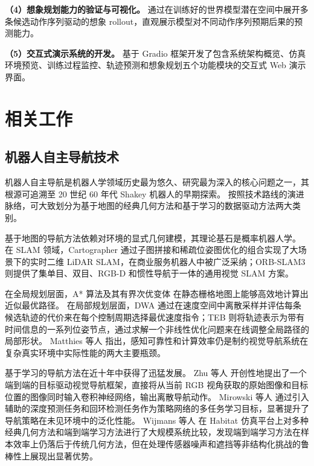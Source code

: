\documentclass[12pt,a4paper]{ctexart}
\begin{document}
\textbf{（4）想象规划能力的验证与可视化。}
通过在训练好的世界模型潜在空间中展开多条候选动作序列驱动的想象 rollout，直观展示模型对不同动作序列预期后果的预测能力。

\textbf{（5）交互式演示系统的开发。}
基于 Gradio 框架开发了包含系统架构概览、仿真环境预览、训练过程监控、轨迹预测和想象规划五个功能模块的交互式 Web 演示界面。

\section{相关工作}

\subsection{机器人自主导航技术}

机器人自主导航是机器人学领域历史最为悠久、研究最为深入的核心问题之一，其根源可追溯至 20 世纪 60 年代 Shakey 机器人的早期探索。
按照技术路线的演进脉络，可大致划分为基于地图的经典几何方法和基于学习的数据驱动方法两大类别。

基于地图的导航方法依赖对环境的显式几何建模，其理论基石是概率机器人学\cite{thrun2005probabilistic}。
在 SLAM 领域，Cartographer\cite{hess2016real} 通过子图拼接和稀疏位姿图优化的组合实现了大场景下的实时二维 LiDAR SLAM，在商业服务机器人中被广泛采纳；ORB-SLAM3\cite{campos2021orb} 则提供了集单目、双目、RGB-D 和惯性导航于一体的通用视觉 SLAM 方案。

在全局规划层面，A* 算法及其有界次优变体\cite{likhachev2005ara} 在静态栅格地图上能够高效地计算出近似最优路径。
在局部规划层面，DWA\cite{fox1997dynamic} 通过在速度空间中离散采样并评估每条候选轨迹的代价来在每个控制周期选择最优速度指令；TEB\cite{rosmann2012trajectory} 则将轨迹表示为带有时间信息的一系列位姿节点，通过求解一个非线性优化问题来在线调整全局路径的局部形状。
Matthies 等人\cite{matthies2007computer} 指出，感知可靠性和计算效率仍是制约视觉导航系统在复杂真实环境中实际性能的两大主要瓶颈。

基于学习的导航方法在近十年中获得了迅猛发展。
Zhu 等人\cite{zhu2017target} 开创性地提出了一个端到端的目标驱动视觉导航框架，直接将从当前 RGB 视角获取的原始图像和目标位置的图像同时输入卷积神经网络，输出离散导航动作。
Mirowski 等人\cite{mirowski2017learning} 通过引入辅助的深度预测任务和回环检测任务作为策略网络的多任务学习目标，显著提升了导航策略在未见环境中的泛化性能。
Wijmans 等人\cite{wijmans2020dd} 在 Habitat 仿真平台上对多种经典几何方法和端到端学习方法进行了大规模系统比较，发现端到端学习方法在样本效率上仍落后于传统几何方法，但在处理传感器噪声和遮挡等非结构化挑战的鲁棒性上展现出显著优势。
\end{document}
